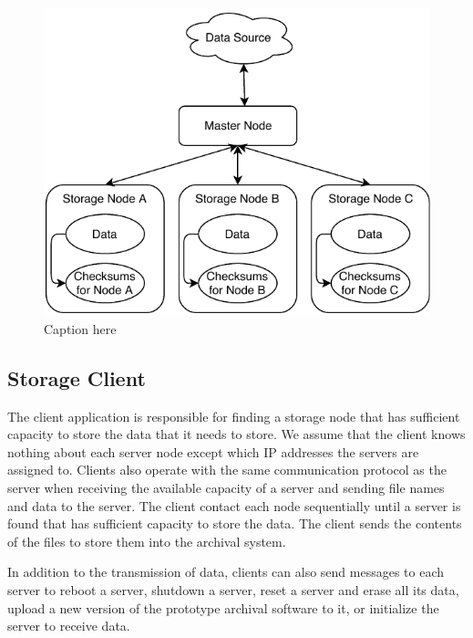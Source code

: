 \begin{figure}[!ht]
\includegraphics[width=\linewidth]{fig3.pdf}
\caption{Caption here}
\label{fig3}
\end{figure}

\subsection{Storage Client}
The client application is responsible for finding a storage node that has sufficient capacity to store the data that it needs to store.  We assume that the client knows nothing about each server node except which IP addresses the servers are assigned to.  Clients also operate with the same communication protocol as the server when receiving the available capacity of a server and sending file names and data to the server.   The client contact each node sequentially until a server is found that has sufficient capacity to store the data.  The client sends the contents of the files to store them into the archival system.

In addition to the transmission of data, clients can also send messages to each server to reboot a server, shutdown a server, reset a server and erase all its data, upload a new version of the prototype archival software to it, or initialize the server to receive data.

